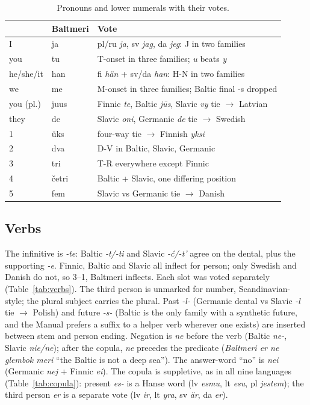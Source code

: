 \begin{table}[t]
\centering\small
\caption{Pronouns and lower numerals with their votes.}
\label{tab:pronouns}
\begin{tabular}{@{}llp{4.6cm}@{}}
\toprule
& Baltmeri & Vote \\
\midrule
I & ja & pl/ru \emph{ja}, sv \emph{jag}, da \emph{jeg}: J in two families \\
you & tu & T-onset in three families; \emph{u} beats \emph{y} \\
he/she/it & han & fi \emph{hän} + sv/da \emph{han}: H-N in two families \\
we & me & M-onset in three families; Baltic final -s dropped \\
you (pl.) & juus & Finnic \emph{te}, Baltic \emph{jūs}, Slavic \emph{vy} tie $\rightarrow$ Latvian \\
they & de & Slavic \emph{oni}, Germanic \emph{de} tie $\rightarrow$ Swedish \\
\midrule
1 & üks & four-way tie $\rightarrow$ Finnish \emph{yksi} \\
2 & dva & D-V in Baltic, Slavic, Germanic \\
3 & tri & T-R everywhere except Finnic \\
4 & četri & Baltic + Slavic, one differing position \\
5 & fem & Slavic vs Germanic tie $\rightarrow$ Danish \\
\bottomrule
\end{tabular}
\end{table}

\subsection{Verbs}
The infinitive is \emph{-te}: Baltic \emph{-t/-ti} and Slavic \emph{-ć/-t'} agree on the dental, plus the supporting \emph{-e}. Finnic, Baltic and Slavic all inflect for person; only Swedish and Danish do not, so 3--1, Baltmeri inflects. Each slot was voted separately (Table~\ref{tab:verbs}). The third person is unmarked for number, Scandinavian-style; the plural subject carries the plural. Past \emph{-l-} (Germanic dental vs Slavic \emph{-l} tie $\rightarrow$ Polish) and future \emph{-s-} (Baltic is the only family with a synthetic future, and the Manual prefers a suffix to a helper verb wherever one exists) are inserted between stem and person ending. Negation is \emph{ne} before the verb (Baltic \emph{ne-}, Slavic \emph{nie/ne}); after the copula, \emph{ne} precedes the predicate (\emph{Baltmeri er ne glembok meri} ``the Baltic is not a deep sea''). The answer-word ``no'' is \emph{nei} (Germanic \emph{nej} + Finnic \emph{ei}). The copula is suppletive, as in all nine languages (Table~\ref{tab:copula}): present \emph{es-} is a Hanse word (lv \emph{esmu}, lt \emph{esu}, pl \emph{jestem}); the third person \emph{er} is a separate vote (lv \emph{ir}, lt \emph{yra}, sv \emph{är}, da \emph{er}).

